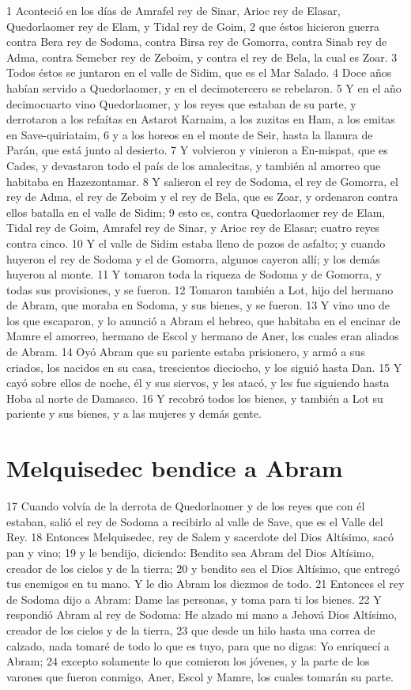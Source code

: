 1 Aconteció en los días de Amrafel rey de Sinar, Arioc rey de Elasar, Quedorlaomer rey de Elam, y Tidal rey de Goim,
2 que éstos hicieron guerra contra Bera rey de Sodoma, contra Birsa rey de Gomorra, contra Sinab rey de Adma, contra Semeber rey de Zeboim, y contra el rey de Bela, la cual es Zoar.
3 Todos éstos se juntaron en el valle de Sidim, que es el Mar Salado.
4 Doce años habían servido a Quedorlaomer, y en el decimotercero se rebelaron.
5 Y en el año decimocuarto vino Quedorlaomer, y los reyes que estaban de su parte, y derrotaron a los refaítas en Astarot Karnaim, a los zuzitas en Ham, a los emitas en Save-quiriataim,
6 y a los horeos en el monte de Seir, hasta la llanura de Parán, que está junto al desierto.
7 Y volvieron y vinieron a En-mispat, que es Cades, y devastaron todo el país de los amalecitas, y también al amorreo que habitaba en Hazezontamar.
8 Y salieron el rey de Sodoma, el rey de Gomorra, el rey de Adma, el rey de Zeboim y el rey de Bela, que es Zoar, y ordenaron contra ellos batalla en el valle de Sidim;
9 esto es, contra Quedorlaomer rey de Elam, Tidal rey de Goim, Amrafel rey de Sinar, y Arioc rey de Elasar; cuatro reyes contra cinco.
10 Y el valle de Sidim estaba lleno de pozos de asfalto; y cuando huyeron el rey de Sodoma y el de Gomorra, algunos cayeron allí; y los demás huyeron al monte.
11 Y tomaron toda la riqueza de Sodoma y de Gomorra, y todas sus provisiones, y se fueron.
12 Tomaron también a Lot, hijo del hermano de Abram, que moraba en Sodoma, y sus bienes, y se fueron.
13 Y vino uno de los que escaparon, y lo anunció a Abram el hebreo, que habitaba en el encinar de Mamre el amorreo, hermano de Escol y hermano de Aner, los cuales eran aliados de Abram.
14 Oyó Abram que su pariente estaba prisionero, y armó a sus criados, los nacidos en su casa, trescientos dieciocho, y los siguió hasta Dan.
15 Y cayó sobre ellos de noche, él y sus siervos, y les atacó, y les fue siguiendo hasta Hoba al norte de Damasco.
16 Y recobró todos los bienes, y también a Lot su pariente y sus bienes, y a las mujeres y demás gente.

\section{Melquisedec bendice a Abram}

17 Cuando volvía de la derrota de Quedorlaomer y de los reyes que con él estaban, salió el rey de Sodoma a recibirlo al valle de Save, que es el Valle del Rey.
18 Entonces Melquisedec, rey de Salem y sacerdote del Dios Altísimo, sacó pan y vino;
19 y le bendijo, diciendo: Bendito sea Abram del Dios Altísimo, creador de los cielos y de la tierra;
20 y bendito sea el Dios Altísimo, que entregó tus enemigos en tu mano. Y le dio Abram los diezmos de todo.
21 Entonces el rey de Sodoma dijo a Abram: Dame las personas, y toma para ti los bienes.
22 Y respondió Abram al rey de Sodoma: He alzado mi mano a Jehová Dios Altísimo, creador de los cielos y de la tierra,
23 que desde un hilo hasta una correa de calzado, nada tomaré de todo lo que es tuyo, para que no digas: Yo enriquecí a Abram;
24 excepto solamente lo que comieron los jóvenes, y la parte de los varones que fueron conmigo, Aner, Escol y Mamre, los cuales tomarán su parte.

